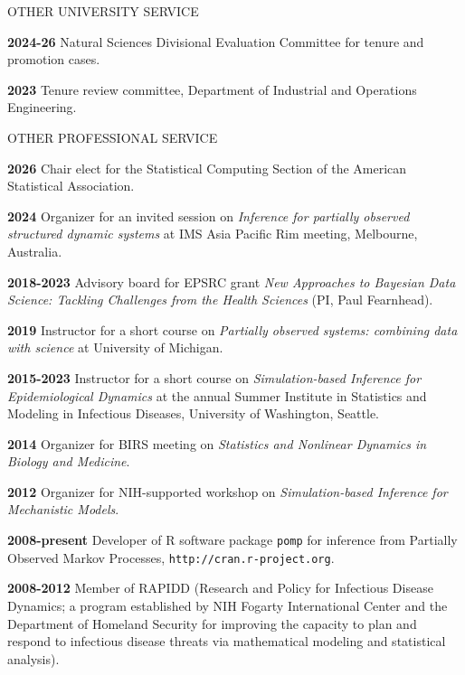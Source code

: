 \lsp

\begin{mylist}{OTHER UNIVERSITY SERVICE}
\item{\bf 2024-26 } Natural Sciences Divisional Evaluation Committee for tenure and promotion cases.
\item{\bf 2023 } Tenure review committee, Department of Industrial and Operations Engineering.
\end{mylist}

\begin{mylist}{OTHER PROFESSIONAL SERVICE}

\item{\bf 2026 } Chair elect for the Statistical Computing Section of the American Statistical Association.
  
\item{\bf 2024 } Organizer for an invited session on {\it Inference for partially observed structured dynamic systems} at IMS Asia Pacific Rim meeting, Melbourne, Australia.
   
\item{\bf 2018-2023 } Advisory board for EPSRC grant {\it New Approaches to Bayesian Data Science: Tackling Challenges from the Health Sciences}  (PI, Paul Fearnhead).

\item{\bf 2019 } Instructor for a short course on {\it Partially observed systems: combining data with science} at University of Michigan.

\item{\bf 2015-2023 } Instructor for a short course on {\it Simulation-based Inference for Epidemiological Dynamics} at the annual Summer Institute in Statistics and Modeling in Infectious Diseases, University of Washington, Seattle.

\item{\bf 2014 } Organizer for BIRS meeting on {\it Statistics and Nonlinear Dynamics in Biology and Medicine}.

\item{\bf 2012 } Organizer for NIH-supported workshop on {\it Simulation-based Inference for Mechanistic Models}.

\item{\bf 2008-present } Developer of R software package {\texttt{pomp}} for inference from Partially Observed Markov Processes, {\texttt{http://cran.r-project.org}}.

\item{\bf 2008-2012 } Member of RAPIDD (Research and Policy for Infectious Disease Dynamics; a program established by NIH Fogarty International Center and the Department of Homeland Security for improving the capacity to plan and respond to infectious disease threats via mathematical modeling and statistical analysis).


\end{mylist}
